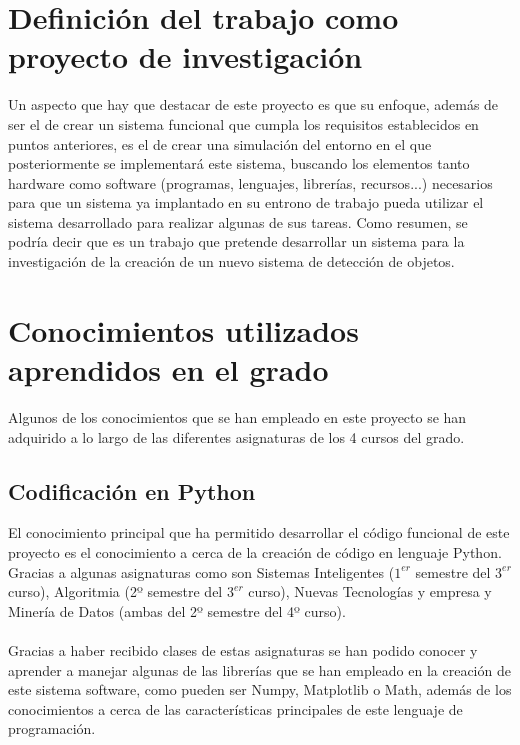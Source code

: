 
\section{Definición del trabajo como proyecto de investigación}

Un aspecto que hay que destacar de este proyecto es que su enfoque, además de ser el de crear un sistema funcional que cumpla los requisitos establecidos en puntos anteriores, es el de crear una simulación del entorno en el que posteriormente se implementará este sistema, buscando los elementos tanto hardware como software (programas, lenguajes, librerías, recursos...)  necesarios para que un sistema ya implantado en su entrono de trabajo pueda utilizar el sistema desarrollado para realizar algunas de sus tareas. Como resumen, se podría decir que es un trabajo que pretende desarrollar un sistema para la investigación de la creación de un nuevo sistema de detección de objetos.\\

\section{Conocimientos utilizados aprendidos en el grado}

Algunos de los conocimientos que se han empleado en este proyecto se han adquirido a lo largo de las diferentes asignaturas de los 4 cursos del grado.\\

\subsection{Codificación en Python}
El conocimiento principal que ha permitido desarrollar el código funcional de este proyecto es el conocimiento a cerca de la creación de código en lenguaje Python. Gracias a algunas asignaturas como son Sistemas Inteligentes ($1^{er}$ semestre del $3^{er}$ curso), Algoritmia (2º semestre del $3^{er}$ curso), Nuevas Tecnologías y empresa y Minería de Datos (ambas del 2º semestre del 4º curso).\\
\\
Gracias a haber recibido clases de estas asignaturas se han podido conocer y aprender a manejar algunas de las librerías que se han empleado en la creación de este sistema software, como pueden ser Numpy, Matplotlib o Math, además de los conocimientos a cerca de las características principales de este lenguaje de programación.\\

